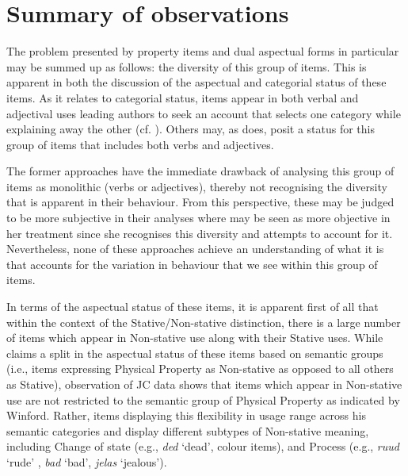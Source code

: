 \section{Summary of observations}\label{sec:3.4}

The problem presented by property items and dual aspectual forms in
particular may be summed up as follows: the diversity of this group of
items.  This is apparent in both the discussion of the aspectual and
categorial status of these items.  As it relates to categorial status,
items appear in both verbal and adjectival uses leading authors to
seek an account that selects one category while explaining away the
other (cf. \citealt{Sebba1986,Seuren1986}).  Others may, as
\citet{Kouwenberg1996} does, posit a status for this group of items
that includes both verbs and adjectives.

The former approaches have the immediate drawback of analysing this
group of items as monolithic (verbs or adjectives), thereby not
recognising the diversity that is apparent in their behaviour.  From
this perspective, these may be judged to be more subjective in their
analyses where \citet{Kouwenberg1996} may be seen as more objective in
her treatment since she recognises this diversity and attempts to
account for it.  Nevertheless, none of these approaches achieve an
understanding of what it is that accounts for the variation in
behaviour that we see within this group of items.

In terms of the aspectual status of these items, it is apparent first
of all that within the context of the Stative\slash Non-stative distinction,
there is a large number of items which appear in Non-stative use along
with their Stative uses.  While \citet{Winford1993} claims a split in
the aspectual status of these items based on semantic groups (i.e.,
items expressing Physical Property as Non-stative as opposed to all
others as Stative), observation of JC data shows that items which
appear in Non-stative use are not restricted to the semantic group of
Physical Property as indicated by Winford.  Rather, items displaying
this flexibility in usage range across his semantic categories and
display different subtypes of Non-stative meaning, including Change of
state (e.g., \textit{ded} `dead', colour items), and Process (e.g.,
\textit{ruud} `rude' , \textit{bad} `bad', \textit{jelas} `jealous').


